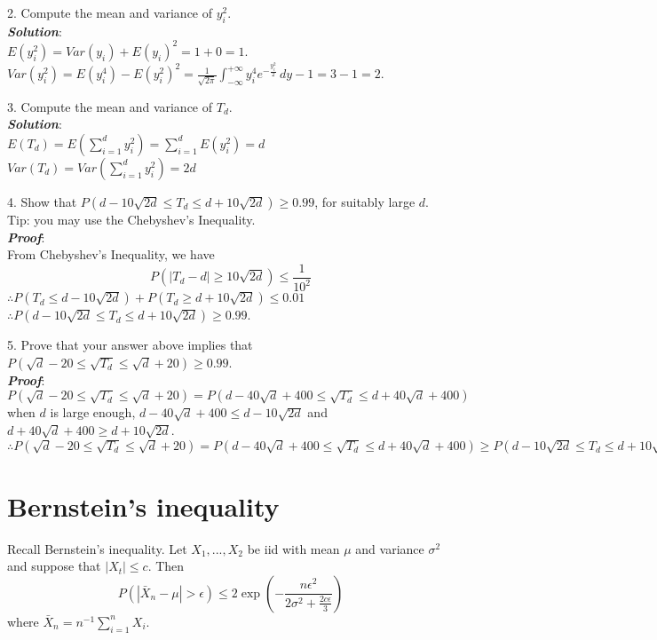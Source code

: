 \documentclass{article}
\theoremstyle{definition}
\theoremstyle{definition}
\theoremstyle{remark}
\begin{document}
2. Compute the mean and variance of $y_i^2$.\\
\emph{\textbf{Solution}}:\\
$E(y_i^2) = Var(y_i)+E(y_i)^2 = 1 + 0 = 1$.\\
$Var(y_i^2) = E(y_i^4)-E(y_i^2)^2 = \frac{1}{\sqrt{2\pi}}\int_{-\infty}^{+\infty}y_i^4 e^{-\frac{y_i^2}{2}}\,dy - 1 =  3 - 1 = 2.$

3. Compute the mean and variance of $T_d$.\\
\emph{\textbf{Solution}}:\\
$E(T_d)=E(\sum_{i=1}^d y_i^2) = \sum_{i=1}^d E(y_i^2)=d$ \\
$Var(T_d)=Var(\sum_{i=1}^d y_i^2)=2d$

4. Show that $P(d-10\sqrt{2d}\leq T_d \leq d+10\sqrt{2d})\geq 0.99$, for suitably large $d$. Tip: you may use the Chebyshev's Inequality.\\
\emph{\textbf{Proof}}:\\
From Chebyshev's Inequality, we have
\[ P(|T_d-d|\geq10\sqrt{2d})\leq\frac{1}{10^2}\]
$\therefore P(T_d \leq d-10\sqrt{2d})+P(T_d \geq d+10\sqrt{2d})\leq0.01$\\
$\therefore P(d-10\sqrt{2d}\leq T_d \leq d+10\sqrt{2d})\geq 0.99$.

5. Prove that your answer above implies that $P(\sqrt d - 20 \leq \sqrt{T_d} \leq \sqrt d + 20)\geq 0.99$.\\
\emph{\textbf{Proof}}:\\
$P(\sqrt d - 20 \leq \sqrt{T_d} \leq \sqrt d + 20) = P(d - 40\sqrt d+400\leq \sqrt{T_d} \leq  d + 40\sqrt d +400) $\\
when $d$ is large enough, $d - 40\sqrt d+400\leq d-10\sqrt{2d}$ and $d + 40\sqrt d +400\geq d+10\sqrt{2d}$.\\
$\therefore P(\sqrt d - 20 \leq \sqrt{T_d} \leq \sqrt d + 20) = P(d - 40\sqrt d+400\leq \sqrt{T_d} \leq  d + 40\sqrt d +400) \geq P(d-10\sqrt{2d}\leq T_d \leq d+10\sqrt{2d})\geq 0.99.$
\section*{Bernstein's inequality}

Recall Bernstein's inequality. Let $X_1,...,X_2$ be iid with mean $\mu$ and variance $\sigma^2$ and suppose that $|X_t|\leq c$. Then
\[
P(|\bar{X}_n-\mu|>\epsilon)\leq 2\exp\left(-\frac{n\epsilon^2}{2\sigma^2+\frac{2c\epsilon}{3}}\right)
\]
where $\bar{X}_n=n^{-1}\sum_{i=1}^n X_i$.
\end{document}
